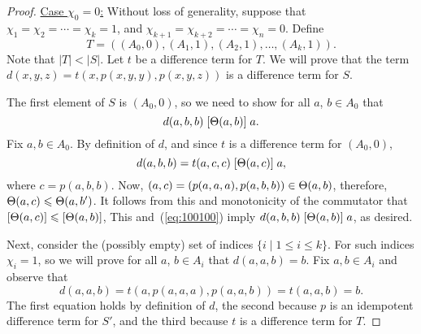 \begin{proof}
  \medskip

\noindent \underline{Case $\chi_0 = 0$:}
Without loss of generality, suppose that
$\chi_1 = \chi_2 = \cdots =\chi_k = 1$,
and
$\chi_{k+1} = \chi_{k+2} = \cdots = \chi_{n} = 0$.
Define
\[
T = ((A_0, 0), (A_1, 1), (A_2, 1), \dots, (A_k, 1)).
\]
Note that $|T| < |S|$.
Let $t$ be a \glocal difference term for $T$.
We will prove that the term $d(x,y,z) = t(x, p(x,y,y), p(x,y,z))$
is a \glocal difference term for $S$.

The first element of $S$ is $(A_0, 0)$, so we need to show for all $a$, $b \in A_0$
that
\[
d(a,b,b) \mathrel{[\Theta(a,b)]} a.
\]
Fix $a, b \in A_0$.
By definition of $d$, and since
$t$ is a \glocal difference term for $(A_0, 0)$,
\begin{equation}
  \label{eq:100100}
  d(a,b,b) 
  =t(a, c, c)\Comr{\Cg(a, c)} a,
\end{equation}
where $c = p(a,b,b)$.
Now, $(a, c) = (p(a,a,a), p(a,b,b)) \in \Theta(a, b)$, therefore,
$\Theta(a, c) \leqslant \Theta(a,b')$.
It follows from this and monotonicity of the commutator that
$[\Theta(a, c)] \leqslant [\Theta(a,b)]$,
This and~(\ref{eq:100100}) imply
$d(a,b,b)\mathrel{[\Theta(a,b)]} a$,
as desired.

Next, consider the (possibly empty) set of indices $\{i \mid 1\leq i \leq k\}$.
For such indices $\chi_i =1$, so we will prove
for all $a$, $b \in A_i$ that $d(a,a,b) = b$.
Fix $a, b \in A_i$ and observe that
\[
  d(a,a,b) =
  t(a, p(a,a,a), p(a,a,b)) %
  =t(a,a,b) %
  =b. %
\]
The first equation holds by definition of $d$, the second
because $p$ is an idempotent \glocal difference term for
$S'$, and the third because $t$ is a \glocal difference term for $T$.


\end{proof}
